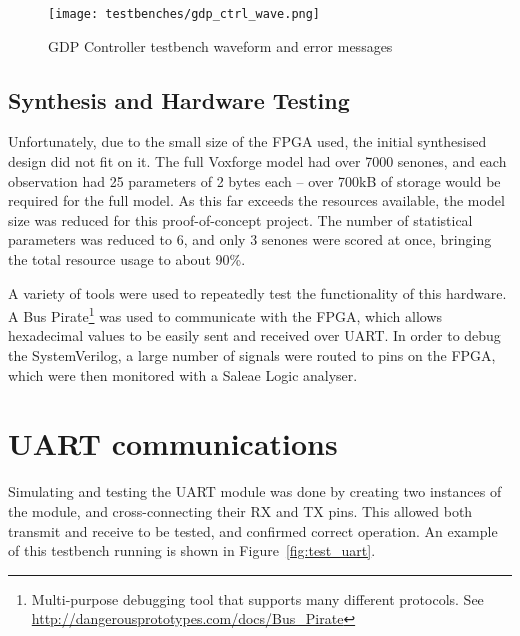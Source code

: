 
	\begin{figure}[tb]
		\begin{center}
			\texttt{[image: testbenches/gdp\_ctrl\_wave.png]}
		\end{center}
		\caption{GDP Controller testbench waveform and error messages}
		\label{fig:test_gdp_ctrl}
	\end{figure}

	\subsection{Synthesis and Hardware Testing} %
	\label{sub:gdp_synthesis_and_hardware_testing}
		Unfortunately, due to the small size of the FPGA used, the initial synthesised design did not fit on it.  The full Voxforge model had over 7000 senones, and each observation had 25 parameters of 2 bytes each -- over 700kB of storage would be required for the full model.  As this far exceeds the resources available, the model size was reduced for this proof-of-concept project.  The number of statistical parameters was reduced to 6, and only 3 senones were scored at once, bringing the total resource usage to about 90\%.  %

		A variety of tools were used to repeatedly test the functionality of this hardware.  A Bus Pirate\footnote{Multi-purpose debugging tool that supports many different protocols.  See \href{http://dangerousprototypes.com/docs/Bus_Pirate}{http://dangerousprototypes.com/docs/Bus_Pirate}} was used to communicate with the FPGA, which allows hexadecimal values to be easily sent and received over UART.  In order to debug the SystemVerilog, a large number of signals were routed to pins on the FPGA, which were then monitored with a Saleae Logic analyser.



\section{UART communications} %
\label{sec:uart_communications_testing}
	Simulating and testing the UART module was done by creating two instances of the module, and cross-connecting their RX and TX pins.  This allowed both transmit and receive to be tested, and confirmed correct operation.  An example of this testbench running is shown in Figure~\ref{fig:test_uart}.  


